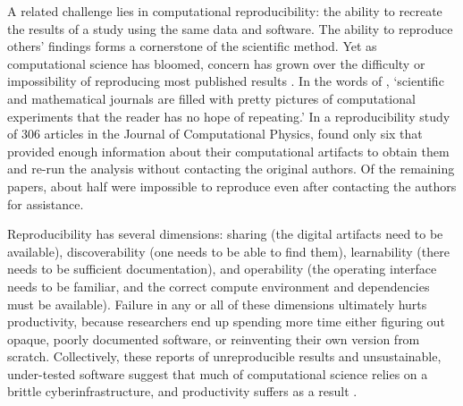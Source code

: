 \documentclass[12pt]{amsart}
\begin{document}
A related challenge lies in computational reproducibility: the ability to recreate the results of a study using the same data and software. The ability to reproduce others' findings forms a cornerstone of the scientific method. Yet as computational science has bloomed, concern has grown over the difficulty or impossibility of reproducing most published results \citep[e.g.,][]{schwab2000making,peng2011reproducible,stodden2013setting,barba2016hard,alnoamany2018towards,chen2019open,krafczyk2019scientific}. In the words of \citet{leveque2009python}, `scientific and mathematical journals are filled with pretty pictures of computational experiments that the reader has no hope of repeating.' In a reproducibility study of 306 articles in the Journal of Computational Physics, \citet{stodden2018enabling} found only six that provided enough information about their computational artifacts to obtain them and re-run the analysis without contacting the original authors. Of the remaining papers, about half were impossible to reproduce even after contacting the authors for assistance.

Reproducibility has several dimensions: sharing (the digital artifacts need to be available), discoverability (one needs to be able to find them), learnability (there needs to be sufficient documentation), and operability (the operating interface needs to be familiar, and the correct compute environment and dependencies must be available). Failure in any or all of these dimensions ultimately hurts productivity, because researchers end up spending more time either figuring out opaque, poorly documented software, or reinventing their own version from scratch. Collectively, these reports of unreproducible results and unsustainable, under-tested software suggest that much of computational science relies on a brittle cyberinfrastructure, and productivity suffers as a result \citep{wilson2006s,faulk2009scientific,prabhu2011survey}.
\end{document}
